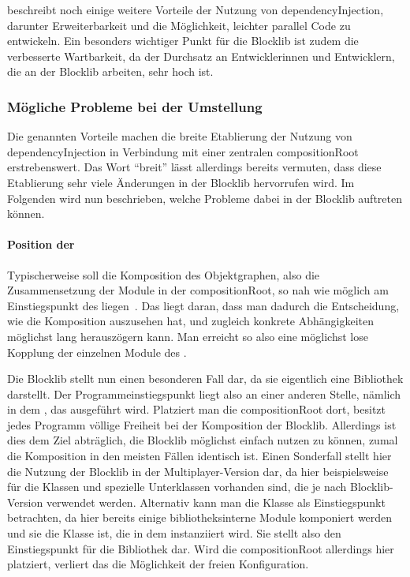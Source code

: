 \textcite[S.~15~\psqq]{Seemann2012} beschreibt noch einige weitere Vorteile der Nutzung von \gls{dependencyInjection}, darunter Erweiterbarkeit und die Möglichkeit, leichter parallel Code zu entwickeln. Ein besonders wichtiger Punkt für die Blocklib ist zudem die verbesserte Wartbarkeit, da der Durchsatz an Entwicklerinnen und Entwicklern, die an der Blocklib arbeiten, sehr hoch ist.

\subsubsection{Mögliche Probleme bei der Umstellung}
Die genannten Vorteile machen die breite Etablierung der Nutzung von \gls{dependencyInjection} in Verbindung mit einer zentralen \gls{compositionRoot} erstrebenswert. Das Wort \enquote{breit} lässt allerdings bereits vermuten, dass diese Etablierung sehr viele Änderungen in der Blocklib hervorrufen wird. Im Folgenden wird nun beschrieben, welche Probleme dabei in der Blocklib auftreten können.

\paragraph{Position der }
Typischerweise soll die Komposition des Objektgraphen, also die Zusammensetzung der Module in der \gls{compositionRoot}, so nah wie möglich am Einstiegspunkt des  liegen~\cites[S.~232~\psqq]{Martin17}[S.~76~\psq]{Seemann2012}. Das liegt daran, dass man dadurch die Entscheidung, wie die Komposition auszusehen hat, und zugleich konkrete Abhängigkeiten möglichst lang herauszögern kann. Man erreicht so also eine möglichst lose Kopplung der einzelnen Module des .

Die Blocklib stellt nun einen besonderen Fall dar, da sie eigentlich eine Bibliothek darstellt. Der Programmeinstiegspunkt liegt also an einer anderen Stelle, nämlich in dem \classBlockLibProgram{}, das ausgeführt wird. Platziert man die \gls{compositionRoot} dort, besitzt jedes \gls{Programm} völlige Freiheit bei der Komposition der Blocklib. Allerdings ist dies dem Ziel abträglich, die Blocklib möglichst einfach nutzen zu können, zumal die Komposition in den meisten Fällen identisch ist. Einen Sonderfall stellt hier die Nutzung der Blocklib in der Multiplayer-Version dar, da hier beispielsweise für die Klassen \classWorldInteraction{} und \classContext{} spezielle Unterklassen vorhanden sind, die je nach Blocklib-Version verwendet werden. Alternativ kann man die Klasse \classGame{} als Einstiegspunkt betrachten, da hier bereits einige bibliotheksinterne Module komponiert werden und sie die Klasse ist, die in dem \classBlockLibProgram{} instanziiert wird. Sie stellt also den Einstiegspunkt für die Bibliothek dar. Wird die \gls{compositionRoot} allerdings hier platziert, verliert das \classBlockLibProgram{} die Möglichkeit der freien Konfiguration.

